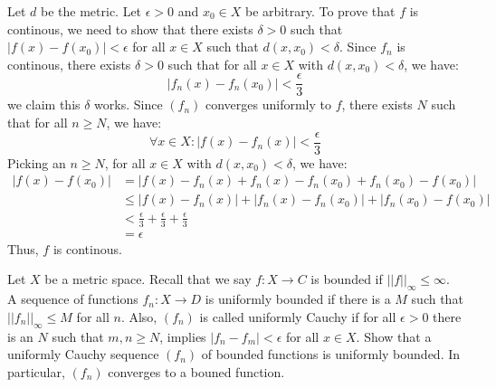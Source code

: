 \documentclass[12pt]{article}
\begin{document}
\begin{solution}
    Let $d$ be the metric. Let $\epsilon > 0$ and $x_0 \in X$ be arbitrary. To prove that $f$ is continous, we need to show that there exists $\delta > 0$ such that $|f(x) - f(x_0)| < \epsilon$ for all $x \in X$ such that $d(x,x_0) < \delta$. \bbni
    Since $f_n$ is continous, there exists $\delta > 0$ such that for all $x \in X$ with $d(x, x_0) < \delta$, we have:
    \[ |f_n(x) - f_n(x_0)| < \frac{\epsilon}{3} \]
    we claim this $\delta$ works. 
    Since $(f_n)$ converges uniformly to $f$, there exists $N$ such that for all $n \geq N$, we have:
    \[ \forall x \in X: |f(x) - f_n(x)| < \frac{\epsilon}{3} \]
    Picking an $n \geq N$, for all $x \in X$ with $d(x, x_0) < \delta$, we have:
    \begin{align*}
        |f(x) -f(x_0)| &= |f(x) - f_n(x) + f_n(x) - f_n(x_0) + f_n(x_0) - f(x_0)| \\
        &\leq |f(x)-f_n(x)| + |f_n(x) -f_n(x_0)| + |f_n(x_0) - f(x_0)| \\
        &< \frac{\epsilon}{3} + \frac{\epsilon}{3} + \frac{\epsilon}{3} \\
        &= \epsilon
    \end{align*}
    Thus, $f$ is continous. 
\end{solution}
\newpage

\begin{problem}{7}
    Let $X$ be a metric space. Recall that we say $f: X \to C$ is bounded if $||f||_\infty \leq \infty$. A sequence of functions $f_n: X \to D$ is uniformly bounded if there is a $M$ such that $||f_n||_\infty \leq M$ for all $n$. Also, $(f_n)$ is called uniformly Cauchy if for all $\epsilon > 0$ there is an $N$ such that $m, n \geq N$, implies $|f_n - f_m| < \epsilon$ for all $x \in X$. Show that a uniformly Cauchy sequence $(f_n)$ of bounded functions is uniformly bounded. In particular, $(f_n)$ converges to a bouned function.
\end{problem}
\end{document}
